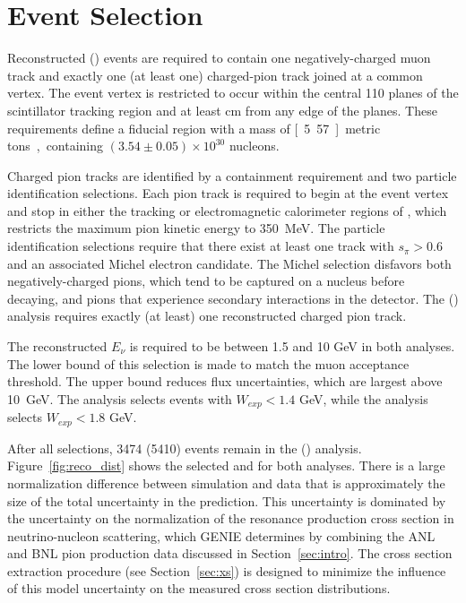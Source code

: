 \section{Event Selection} 
\label{sec:ev_rec}
Reconstructed \cconepi (\ccpi) events are required to contain one negatively-charged muon track and exactly one (at least one) charged-pion track 
joined at a common vertex.  The event vertex is 
restricted to occur within the central 110 planes of the scintillator tracking region and 
at least \unit[22]{cm} from any edge of the planes. These requirements define a 
fiducial region with a mass of \unit[5.57]{metric tons}, containing $(3.54 \pm 0.05) \times 10^{30}$ nucleons.

Charged pion tracks are identified by a containment requirement and two particle identification selections.  Each pion track 
is required to begin at the event vertex and stop in either the tracking or electromagnetic calorimeter regions 
of \minerva, which restricts the maximum pion kinetic energy to 350~MeV.  The particle identification selections require that there exist at 
least one track with $s_\pi>0.6$ and  
an associated Michel electron candidate.  The Michel selection disfavors 
both negatively-charged pions, which tend to be captured on a nucleus before decaying, and pions that experience secondary interactions in the detector.  The
\cconepi (\ccpi) analysis requires exactly (at least) one reconstructed charged pion track.

The reconstructed $E_\nu$ is required to be between 1.5 and 10 GeV in both analyses.  The lower bound of this selection is 
made to match the \minos muon acceptance threshold.  The upper bound reduces 
flux uncertainties, which are largest above 10~GeV.  The \cconepi analysis 
selects events with $W_{exp}<1.4$ GeV, while the \ccpi analysis selects $W_{exp}<1.8$ GeV.

After all selections, 3474 (5410) events remain in the \cconepi (\ccpi) analysis.  Figure~\ref{fig:reco_dist} shows the selected \Tpi and 
\thetapi for both analyses.  There is a large normalization difference between simulation and data that is approximately the size 
of the total uncertainty in the prediction. This uncertainty is dominated by the uncertainty on the normalization of the resonance production cross section in 
neutrino-nucleon scattering, which GENIE determines by combining the ANL and BNL pion production data discussed in Section~\ref{sec:intro}.  
The cross section extraction procedure (see Section~\ref{sec:xs}) is designed to minimize the influence of this model uncertainty on the measured cross section distributions.


